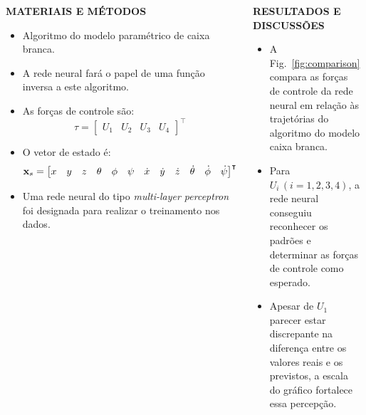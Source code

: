 \documentclass[serif,20pt]{beamer}
\begin{document}
\begin{frame}[t]
\begin{columns}[t]
\begin{block}{\centering\bfseries MATERIAIS E MÉTODOS}
\begin{itemize}\justifying
    \item Algoritmo do modelo paramétrico de caixa branca.\cite{geronel2023}
    \item A rede neural fará o papel de uma função inversa a este algoritmo.
    \item As forças de controle são:
    \begin{equation}
        \tau = \begin{bmatrix}
            U_1 & U_2 & U_3 & U_4
        \end{bmatrix}^{\intercal}
    \end{equation}
    \item O vetor de estado é:
    \begin{equation}
        \setcounter{MaxMatrixCols}{20}
        \mathbf{x}_s = \begin{bmatrix}
            x & y & z & \theta & \phi & \psi & \dot{x} & \dot{y} & \dot{z} & \dot{\theta} & \dot{\phi} & \dot{\psi}
        \end{bmatrix}^{\intercal}
    \end{equation}
    \item Uma rede neural do tipo \emph{multi-layer perceptron} foi designada para realizar o treinamento nos dados.
\end{itemize}
\vspace{1cm}
\end{block}

\begin{block}{\centering\bfseries RESULTADOS E DISCUSSÕES}
\vspace{1cm}
\begin{itemize}\justifying
    \item A Fig.~\ref{fig:comparison} compara as forças de controle da rede neural em relação às trajetórias do algoritmo do modelo caixa branca.
    \item Para \(U_i\, (i=1,2,3,4)\), a rede neural conseguiu reconhecer os padrões e determinar as forças de controle como esperado.
    \item Apesar de \(U_1\) parecer estar discrepante na diferença entre os valores reais e os previstos, a escala do gráfico fortalece essa percepção.
\end{itemize}
\end{block}



\begin{block}{}


\end{block}
\end{columns}
\end{frame}
\end{document}
